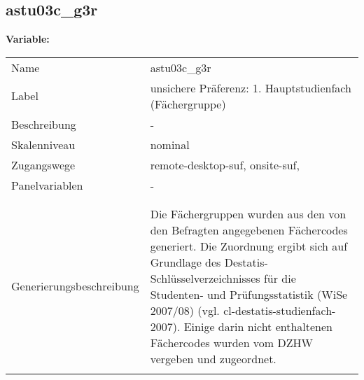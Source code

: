 	
	
	\subsection{astu03c\_g3r}
	\label{subSection:astu03c_g3r}

	\noindent\textbf{Variable:}\\
		\begin{tabular}{lL{11.3cm}}
			\label{tableVariable:astu03c_g3r}
			Name & astu03c\_g3r \\
			Label & unsichere Präferenz: 1. Hauptstudienfach  (Fächergruppe) \\
			Beschreibung & - \\
			Skalenniveau & nominal \\
			Zugangswege &
				remote-desktop-suf,
				onsite-suf,
 \\
			Panelvariablen & -
			 \\
			 \\
 \\
					Generierungsbeschreibung & Die Fächergruppen wurden aus den von den Befragten angegebenen Fächercodes generiert. Die Zuordnung ergibt sich auf Grundlage des Destatis-Schlüsselverzeichnisses für die Studenten- und Prüfungsstatistik (WiSe 2007/08) (vgl. cl-destatis-studienfach-2007).  Einige darin nicht enthaltenen Fächercodes wurden vom DZHW vergeben und zugeordnet. 
				 \\	
			 \\
		\end{tabular}






